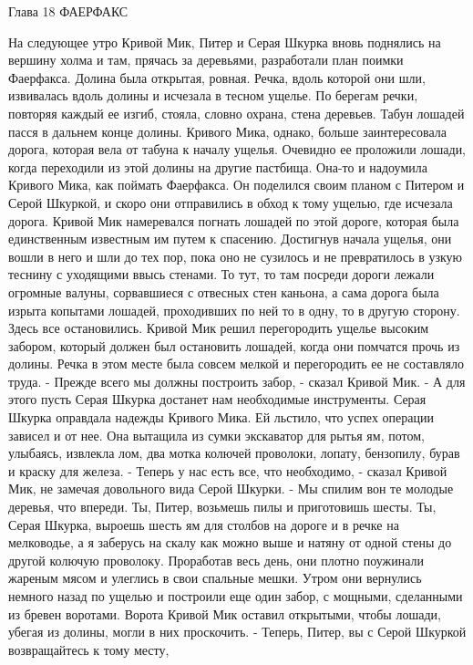 Глава 18
        ФАЕРФАКС

    На следующее утро Кривой Мик, Питер и Серая Шкурка вновь поднялись 
на вершину холма и там, прячась за деревьями, разработали план поимки 
Фаерфакса. Долина была открытая, ровная. Речка, вдоль которой они шли, 
извивалась вдоль долины и исчезала в тесном ущелье. По берегам речки, 
повторяя каждый ее изгиб, стояла, словно охрана, стена деревьев.
    Табун лошадей пасся в дальнем конце долины. Кривого Мика, однако, 
больше заинтересовала дорога, которая вела от табуна к началу ущелья. 
Очевидно ее проложили лошади, когда переходили из этой долины на 
другие пастбища. Она-то и надоумила Кривого Мика, как поймать 
Фаерфакса.
    Он поделился своим планом с Питером и Серой Шкуркой, и скоро они 
отправились в обход к тому ущелью, где исчезала дорога. Кривой Мик 
намеревался погнать лошадей по этой дороге, которая была единственным 
известным им путем к спасению.
    Достигнув начала ущелья, они вошли в него и шли до тех пор, пока 
оно не сузилось и не превратилось в узкую теснину с уходящими ввысь 
стенами. То тут, то там посреди дороги лежали огромные валуны, 
сорвавшиеся с отвесных стен каньона, а сама дорога была изрыта 
копытами лошадей, проходивших по ней то в одну, то в другую сторону.
    Здесь все остановились. Кривой Мик решил перегородить ущелье 
высоким забором, который должен был остановить лошадей, когда они 
помчатся прочь из долины. Речка в этом месте была совсем мелкой и 
перегородить ее не составляло труда.
    - Прежде всего мы должны построить забор, - сказал Кривой Мик. - А 
для этого пусть Серая Шкурка достанет нам необходимые инструменты. 
Серая Шкурка оправдала надежды Кривого Мика. Ей льстило, что успех 
операции зависел и от нее. Она вытащила из сумки экскаватор для рытья 
ям, потом, улыбаясь, извлекла лом, два мотка колючей проволоки, 
лопату, бензопилу, бурав и краску для железа.
    - Теперь у нас есть все, что необходимо, - сказал Кривой Мик, не 
замечая довольного вида Серой Шкурки. - Мы спилим вон те молодые 
деревья, что впереди. Ты, Питер, возьмешь пилы и приготовишь шесты. 
Ты, Серая Шкурка, выроешь шесть ям для столбов на дороге и в речке на 
мелководье, а я заберусь на скалу как можно выше и натяну от одной 
стены до другой колючую проволоку.
    Проработав весь день, они плотно поужинали жареным мясом и 
улеглись в свои спальные мешки. Утром они вернулись немного назад по 
ущелью и построили еще один забор, с мощными, сделанными из бревен 
воротами. Ворота Кривой Мик оставил открытыми, чтобы лошади, убегая из 
долины, могли в них проскочить.
    - Теперь, Питер, вы с Серой Шкуркой возвращайтесь к тому месту, 
